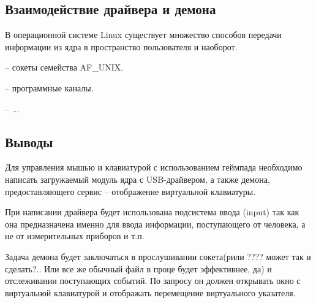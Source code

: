 \subsection{Взаимодействие драйвера и демона}

В операционной системе Linux существует множество способов передачи информации из ядра в пространство пользователя и наоборот.

-- сокеты семейства AF\_UNIX.

-- программные каналы.

-- ...

\subsection*{Выводы}

Для управления мышью и клавиатурой с использованием геймпада необходимо написать загружаемый модуль ядра с USB-драйвером, а также демона, предоставляющего сервис -- отображение виртуальной клавиатуры.

При написании драйвера будет использована подсистема ввода (input) так как она предназначена именно для ввода информации, поступающего от человека, а не от измерительных приборов и т.п.

Задача демона будет заключаться в прослушивании сокета(рили ???? может так и сделать?.. Или все же обычный файл в проце будет эффективнее, да) и отслеживании поступающих событий. По запросу он должен открывать окно с виртуальной клавиатурой и отображать перемещение виртуального указателя.


\pagebreak
